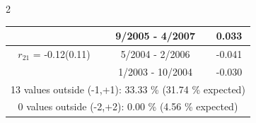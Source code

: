 \begin{multicols}{2}
{\begin{tabular}{ccc}
&        9/2005 -  4/2007 &        0.033  \vspace{-.02in} \\ \hline 
  $r_{21}$ = -0.12(0.11) &       5/2004 -  2/2006 &       -0.041    \vspace{-.10in} \\ 
  &        1/2003 - 10/2004 &       -0.030  \vspace{-.02in}   \\ \hline 
  \multicolumn{3}{c}{              13 values outside (-1,+1): 33.33  \% (31.74  \% expected)}\vspace{-.10in} \\ 
\multicolumn{3}{c}{               0 values outside (-2,+2):  0.00 \%  (4.56 \% expected) } \\
 \end{tabular} \\ 
 } 
\end{multicols} 
